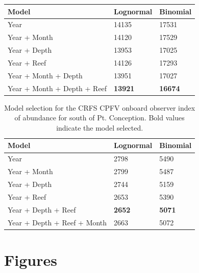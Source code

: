 \documentclass[12pt,]{article}
\begin{document}
\begin{table}[ht]
\begin{tabular}{lll}
  \hline
Model & Lognormal & Binomial \\ 
  \hline
Year & 14135 & 17531 \\ 
  Year + Month & 14120 & 17529 \\ 
  Year + Depth & 13953 & 17025 \\ 
  Year + Reef & 14126 & 17293 \\ 
  Year + Month + Depth & 13951 & 17027 \\ 
  Year + Month + Depth + Reef & \textbf{13921} & \textbf{16674} \\ 
   \hline
\end{tabular}
\end{table}\begin{table}[ht]
\centering
\caption{Model selection for the CRFS CPFV onboard observer 
                                        index of abundance for south of Pt. Conception. Bold 
                                        values indicate the model selected.} 
\label{tab:Fleet7_AIC}
\begin{tabular}{lll}
  \hline
Model & Lognormal & Binomial \\ 
  \hline
Year & 2798 & 5490 \\ 
  Year + Month & 2799 & 5487 \\ 
  Year + Depth & 2744 & 5159 \\ 
  Year + Reef & 2653 & 5390 \\ 
  Year + Depth + Reef & \textbf{2652} & \textbf{5071} \\ 
  Year + Depth + Reef + Month & 2663 & 5072 \\ 
   \hline
\end{tabular}
\end{table}

\FloatBarrier

\newpage

\section{Figures}\label{figures}
\end{document}
